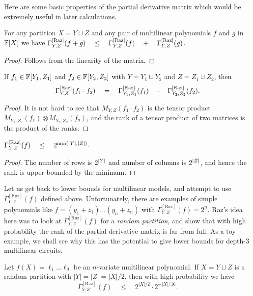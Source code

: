 \documentclass[12pt]{report}
\newcommand{\CM}[1]{\Gamma^{\mathrm{[#1]}}}
\begin{document}
Here are some basic properties of the partial derivative matrix which would be extremely useful in later calculations.

\begin{observation}\label{obs:pdm-subadditivity}
	For any partition $X = Y \sqcup Z$ and any pair of multilinear 
	polynomials $f$ and $g$ in $\mathbb{F}[X]$ we have 
$\CM{Raz}_{Y,Z}(f+g) \spaced{\leq} \CM{Raz}_{Y,Z}(f) \spaced{+} \CM{Raz}_{Y,Z}(g)$.
\end{observation}
\begin{proof}
Follows from the linearity of the matrix. 
\end{proof}

\begin{observation}[Multiplicativity]\label{obs:pdm-multiplicativity}
If $f_1 \in \mathbb{F}[Y_1,Z_1]$ and $f_2 \in \mathbb{F}[Y_2, Z_2]$ with $Y = Y_1 \sqcup Y_2$ and $Z = Z_1 \sqcup Z_2$, then
$$
\CM{Raz}_{Y,Z}(f_1\cdot f_2) \spaced{=} \CM{Raz}_{Y_1, Z_1}(f_1) \spaced{\cdot} \CM{Raz}_{Y_2, Z_2}(f_2).
$$
\end{observation}
\begin{proof}
  It is not hard to see that $M_{Y,Z}(f_1\cdot f_2)$ is the tensor product $M_{Y_1, Z_1}(f_1) \otimes M_{Y_2, Z_2}(f_2)$, and the rank of a tensor product of two matrices is the product of the ranks.
\end{proof}

\begin{observation}\label{obs:pdm-upperbound}
  $\CM{Raz}_{Y,Z}(f) \spaced{\leq} 2^{\min(\abs{Y}, \abs{Z})}$.
\end{observation}
\begin{proof}
  The number of rows is $2^{\left|Y\right|}$ and number of columns is $2^{\left|Z\right|}$, and hence the rank is upper-bounded by the minimum.
\end{proof}


Let us get back to lower bounds for multilinear models, and attempt to use $\CM{Raz}_{Y,Z}(f)$ defined above. Unfortunately, there are examples of simple polynomials like $f = (y_1 + z_1)\dots (y_n + z_n)$ with $\CM{Raz}_{Y,Z}(f) = 2^n$. Raz's idea here was to look at $\CM{Raz}_{Y,Z}(f)$ for a \emph{random partition}, and show that with high probability the rank of the partial derivative matrix is far from full. As a toy example, we shall see why this has the potential to give lower bounds for depth-$3$ multilinear circuits. 

\begin{lemma}
Let $f(X) = \ell_1 \dots \ell_d$ be an $n$-variate multilinear polynomial. If $X = Y\sqcup Z$ is a random partition with $|Y| = |Z| = |X|/2$, then with high probability we have
$$
\CM{Raz}_{Y,Z}(f) \quad \leq \quad 2^{|X|/2} \cdot 2^{-|X|/16}.
$$
\end{lemma}
\end{document}
